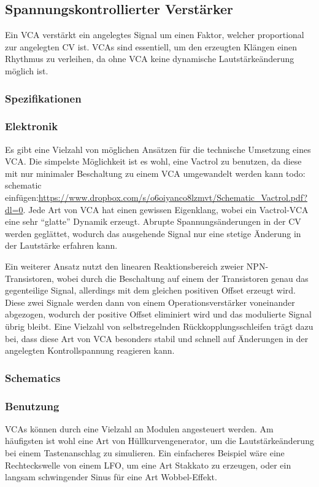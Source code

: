 \subsection{Spannungskontrollierter Verstärker \label{VCA}}
\label{sec:org4f81a0e}
Ein \acf{VCA} verstärkt ein angelegtes Signal um einen Faktor, welcher proportional zur angelegten \acl{CV} ist. \acp{VCA} sind essentiell, um den erzeugten Klängen einen Rhythmus zu verleihen, da ohne \ac{VCA} keine dynamische Lautstärkeänderung möglich ist. 
\subsubsection{Spezifikationen}
\label{sec:org577b646}
\subsubsection{Elektronik}
\label{sec:org99c45a6}
Es gibt eine Vielzahl von möglichen Ansätzen für die technische Umsetzung eines \ac{VCA}. Die simpelste Möglichkeit ist es wohl, eine Vactrol zu benutzen, da diese mit nur minimaler Beschaltung zu einem VCA umgewandelt werden kann todo: schematic einfügen:\url{https://www.dropbox.com/s/o6oiyanco8lzmvt/Schematic\_Vactrol.pdf?dl=0}. Jede Art von \ac{VCA} hat einen gewissen Eigenklang, wobei ein Vactrol-VCA eine sehr "`glatte"' Dynamik erzeugt. Abrupte Spannungsänderungen in der \acl{CV} werden geglättet, wodurch das ausgehende Signal nur eine stetige Änderung in der Lautstärke erfahren kann.

Ein weiterer Ansatz nutzt den linearen Reaktionsbereich zweier NPN-Transistoren, wobei durch die Beschaltung auf einem der Transistoren genau das gegenteilige Signal, allerdings mit dem gleichen positiven Offset erzeugt wird. Diese zwei Signale werden dann von einem Operationsverstärker voneinander abgezogen, wodurch der positive Offset eliminiert wird und das modulierte Signal übrig bleibt. Eine Vielzahl von selbstregelnden Rückkopplungsschleifen trägt dazu bei, dass diese Art von \ac{VCA} besonders stabil und schnell auf Änderungen in der angelegten Kontrollspannung reagieren kann.
\subsubsection{Schematics}
\label{sec:org3f7ed75}
\subsubsection{Benutzung}
\label{sec:org55ef035}
\acp{VCA} können durch eine Vielzahl an Modulen angesteuert werden. Am häufigsten ist wohl eine Art von Hüllkurvengenerator, um die Lautstärkeänderung bei einem Tastenanschlag zu simulieren. Ein einfacheres Beispiel wäre eine Rechteckswelle von einem LFO, um eine Art Stakkato zu erzeugen, oder ein langsam schwingender Sinus für eine Art Wobbel-Effekt.
